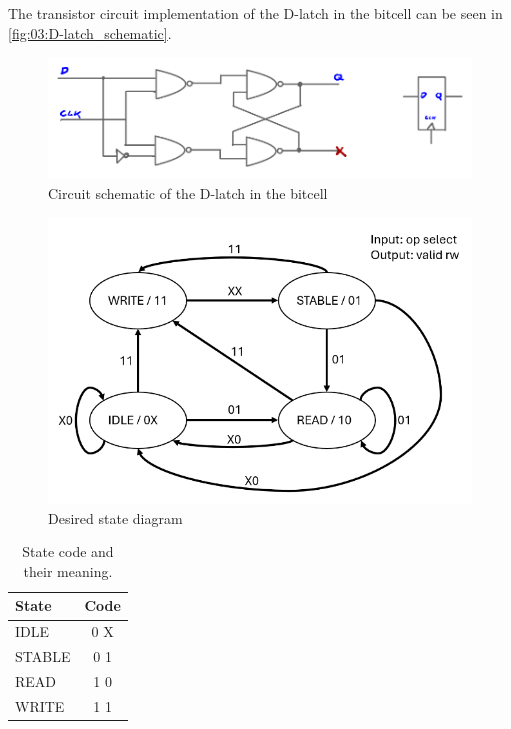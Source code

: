 The transistor circuit implementation of the D-latch in the bitcell can be seen in \autoref{fig:03:D-latch_schematic}.

\begin{figure}[H]
    \centering
    \includegraphics[width=0.8\linewidth]{LaTeX_2/Figures/flipflop.png}
    \caption{Circuit schematic of the D-latch in the bitcell}
    \label{fig:03:D-latch_schematic}
\end{figure}


\begin{figure}
    \centering
    \includegraphics[width=0.8\linewidth]{LaTeX_2/Figures/state_diagram.png}
    \caption{Desired state diagram \cite{oppgavebeskrivelse}}
    \label{fig:03:state_diagram}
\end{figure}

\begin{table}[]
    \caption{State code and their meaning.}
    \centering
    \begin{tabular}{|l|c|}
        \hline
        State   &   Code    \\  \hline
        IDLE    &   0 X     \\  
        STABLE  &   0 1     \\
        READ    &   1 0     \\
        WRITE   &   1 1     \\  \hline
    \end{tabular}
    \label{tab:03:state_code}
\end{table}

